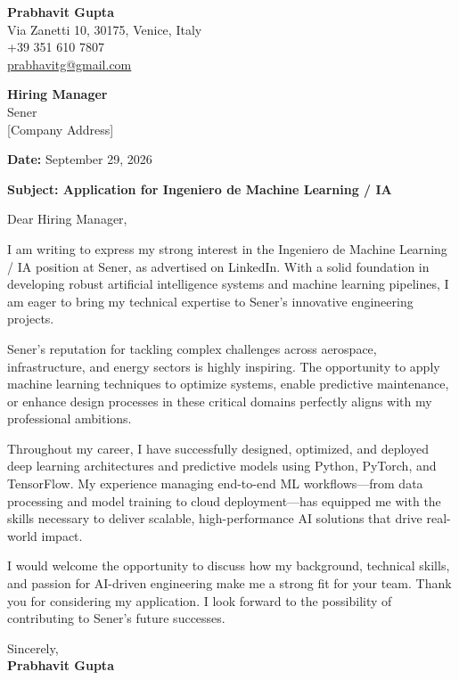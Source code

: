 \documentclass[11pt,a4paper]{article}
\begin{document}
\thispagestyle{empty}

\begin{flushleft}
\textbf{Prabhavit Gupta} \\
Via Zanetti 10, 30175, Venice, Italy \\
+39 351 610 7807 \\
\href{mailto:prabhavitg@gmail.com}{prabhavitg@gmail.com}
\end{flushleft}

\vspace{1cm}

\begin{flushleft}
\textbf{Hiring Manager} \\
Sener \\
{[}Company Address]
\end{flushleft}

\vspace{0.5cm}
\noindent \textbf{Date:} September 29, 2026

\vspace{0.5cm}
\noindent \textbf{Subject: Application for Ingeniero de Machine Learning / IA}

\vspace{0.5cm}
\noindent Dear Hiring Manager,

\vspace{0.5cm}
I am writing to express my strong interest in the Ingeniero de Machine Learning / IA position at Sener, as advertised on LinkedIn. With a solid foundation in developing robust artificial intelligence systems and machine learning pipelines, I am eager to bring my technical expertise to Sener's innovative engineering projects.

Sener's reputation for tackling complex challenges across aerospace, infrastructure, and energy sectors is highly inspiring. The opportunity to apply machine learning techniques to optimize systems, enable predictive maintenance, or enhance design processes in these critical domains perfectly aligns with my professional ambitions.

Throughout my career, I have successfully designed, optimized, and deployed deep learning architectures and predictive models using Python, PyTorch, and TensorFlow. My experience managing end-to-end ML workflows—from data processing and model training to cloud deployment—has equipped me with the skills necessary to deliver scalable, high-performance AI solutions that drive real-world impact.

I would welcome the opportunity to discuss how my background, technical skills, and passion for AI-driven engineering make me a strong fit for your team. Thank you for considering my application. I look forward to the possibility of contributing to Sener's future successes.

\vspace{0.5cm}
\noindent Sincerely, \\
\vspace{0.5cm}
\noindent \textbf{Prabhavit Gupta}
\end{document}
